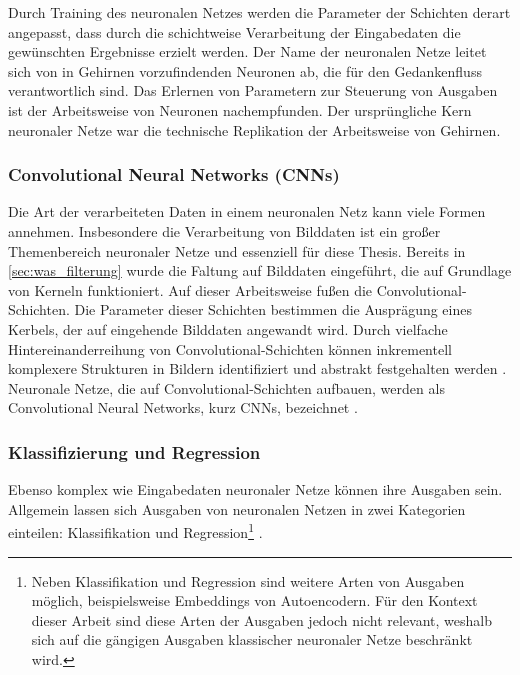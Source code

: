 Durch Training des neuronalen Netzes werden die Parameter der Schichten derart angepasst, dass durch die schichtweise Verarbeitung der Eingabedaten die gewünschten Ergebnisse erzielt werden. Der Name der neuronalen Netze leitet sich von in Gehirnen vorzufindenden Neuronen ab, die für den Gedankenfluss verantwortlich sind. Das Erlernen von Parametern zur Steuerung von Ausgaben ist der Arbeitsweise von Neuronen nachempfunden. Der ursprüngliche Kern neuronaler Netze war die technische Replikation der Arbeitsweise von Gehirnen.

\subsubsection{Convolutional Neural Networks (CNNs)}
\label{sec:cnns}

Die Art der verarbeiteten Daten in einem neuronalen Netz kann viele Formen annehmen. Insbesondere die Verarbeitung von Bilddaten ist ein großer Themenbereich neuronaler Netze und essenziell für diese Thesis. Bereits in \autoref{sec:was_filterung} wurde die Faltung auf Bilddaten eingeführt, die auf Grundlage von Kerneln funktioniert. Auf dieser Arbeitsweise fußen die Convolutional-Schichten. Die Parameter dieser Schichten bestimmen die Ausprägung eines Kerbels, der auf eingehende Bilddaten angewandt wird. Durch vielfache Hintereinanderreihung von Convolutional-Schichten können inkrementell komplexere Strukturen in Bildern identifiziert und abstrakt festgehalten werden \cite{alexnet}. Neuronale Netze, die auf Convolutional-Schichten aufbauen, werden als Convolutional Neural Networks, kurz CNNs, bezeichnet \cite{cv_general}.

\subsubsection{Klassifizierung und Regression}
\label{sec:klassifizierung_regression}

Ebenso komplex wie Eingabedaten neuronaler Netze können ihre Ausgaben sein. Allgemein lassen sich Ausgaben von neuronalen Netzen in zwei Kategorien einteilen: Klassifikation und Regression\footnote{Neben Klassifikation und Regression sind weitere Arten von Ausgaben möglich, beispielsweise Embeddings von Autoencodern. Für den Kontext dieser Arbeit sind diese Arten der Ausgaben jedoch nicht relevant, weshalb sich auf die gängigen Ausgaben klassischer neuronaler Netze beschränkt wird.} \cite{nn_terminology,cv_general}.

